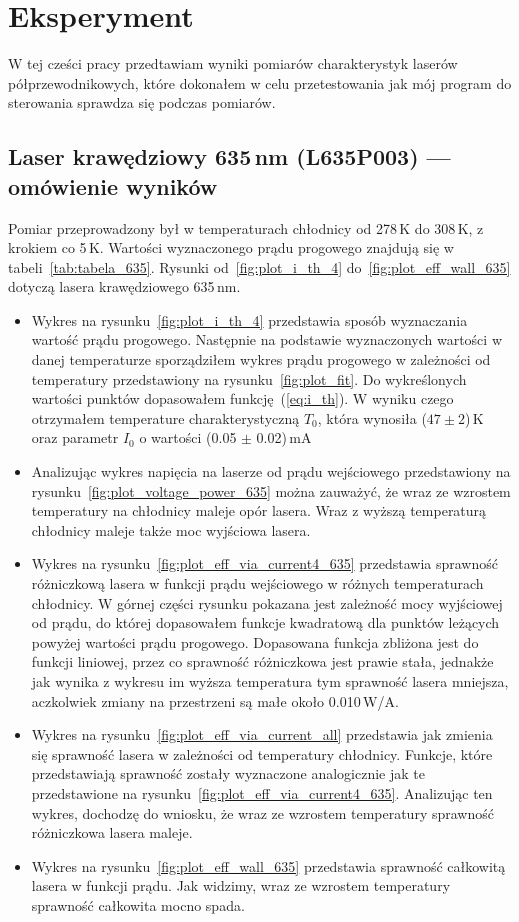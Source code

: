 \section{Eksperyment}
W tej cześci pracy przedtawiam wyniki pomiarów charakterystyk laserów półprzewodnikowych, które dokonałem w celu przetestowania
jak mój program do sterowania sprawdza się podczas pomiarów.
\subsection{Laser krawędziowy 635\,nm (L635P003) --- omówienie wyników}
Pomiar przeprowadzony był w temperaturach chłodnicy od 278\,K do 308\,K, z krokiem co 5\,K. Wartości wyznaczonego prądu progowego
znajdują się w tabeli~\ref{tab:tabela_635}. Rysunki od~\ref{fig:plot_i_th_4} do~\ref{fig:plot_eff_wall_635} dotyczą lasera
krawędziowego 635\,nm.
\begin{itemize}
\item Wykres na rysunku~\ref{fig:plot_i_th_4} przedstawia sposób wyznaczania wartość prądu progowego. Następnie na podstawie
wyznaczonych wartości w danej temperaturze sporządziłem wykres prądu progowego w zależności od temperatury
przedstawiony na rysunku~\ref{fig:plot_fit}. Do wykreślonych wartości punktów dopasowałem funkcję~(\ref{eq:i_th}).
W wyniku czego otrzymałem temperature charakterystyczną $T_0$, która wynosiła ($47 \pm 2$)\,K oraz parametr $I_0$ o wartości (0.05 $\pm$ 0.02)\,mA
\item Analizując wykres napięcia na laserze od prądu wejściowego przedstawiony na rysunku~\ref{fig:plot_voltage_power_635}
można zauważyć, że wraz ze wzrostem temperatury na chłodnicy
maleje opór lasera. Wraz z wyższą temperaturą chłodnicy maleje także moc wyjściowa lasera.
\item Wykres na rysunku~\ref{fig:plot_eff_via_current4_635} przedstawia sprawność różniczkową lasera w funkcji prądu wejściowego
w różnych temperaturach chłodnicy. W górnej części rysunku pokazana jest zależność mocy wyjściowej od prądu, do której dopasowałem
funkcje kwadratową dla punktów leżących powyżej wartości prądu progowego. Dopasowana funkcja zbliżona jest do funkcji liniowej, przez co sprawność różniczkowa jest
prawie stała, jednakże jak wynika z wykresu im wyższa temperatura tym sprawność lasera mniejsza, aczkolwiek zmiany na
przestrzeni są małe około 0.010\,W/A.
\item Wykres na rysunku~\ref{fig:plot_eff_via_current_all} przedstawia jak zmienia się sprawność lasera w zależności od temperatury chłodnicy.
Funkcje, które przedstawiają sprawność zostały wyznaczone analogicznie jak te przedstawione na rysunku~\ref{fig:plot_eff_via_current4_635}.
Analizując ten wykres, dochodzę do wniosku, że wraz ze wzrostem temperatury sprawność różniczkowa lasera maleje.
\item Wykres na rysunku~\ref{fig:plot_eff_wall_635} przedstawia sprawność całkowitą lasera w funkcji prądu. Jak widzimy,
wraz ze wzrostem temperatury sprawność całkowita mocno spada.
\end{itemize}
